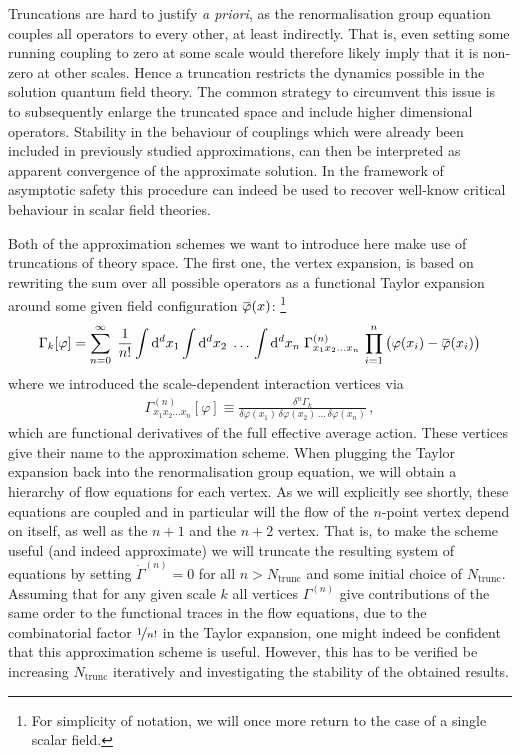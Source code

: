 \documentclass[11pt]{book}
\newcommand{\overbar}[1]{\mkern 1.5mu\overline{\mkern-1.5mu#1\mkern-1.5mu}\mkern 1.5mu}
\newcommand\Ntrunc{ N_{\scriptscriptstyle{\mathrm{trunc}}} }
\newcommand{\bp}{\overbar \varphi}
\numberwithin{equation}{chapter}
\begin{document}
Truncations are hard to justify \textit{a priori}, as the renormalisation
group equation couples all operators to every other, at least indirectly.
That is, even setting some running coupling to zero at some scale would
therefore likely imply that it is non-zero at other scales.
Hence a truncation restricts the dynamics possible in the solution quantum
field theory. The common strategy to circumvent this issue is to
subsequently enlarge the truncated space and include higher dimensional operators.
Stability in the behaviour of couplings which were already been included
in previously studied approximations, can then be interpreted as apparent
convergence of the approximate solution. In the framework of asymptotic
safety this procedure can indeed be used to recover well-know
critical behaviour in scalar field theories.

Both of the approximation schemes we want to introduce here make use
of truncations of theory space. The first one, the vertex expansion,
is based on rewriting the sum over all possible operators as a
functional Taylor expansion around some given field configuration
$\bp(x)$:%
\footnote{%
  For simplicity of notation, we will once more return to the
  case of a single scalar field.
}
\begin{align}
  \Gamma_k [\varphi] =
  \sum_{n=0}^{\infty} \; \frac{1}{n!}
  \int \mathrm d^dx_1
  \int \mathrm d^dx_2
  \; \dots \,
  \int \mathrm d^dx_n \;
  \Gamma_{x_1 x_2 \dots x_n}^{(n)} \,
  \prod_{i=1}^n
  \big( \varphi(x_i) - \bp(x_i) \big)
\end{align}
where we introduced the scale-dependent interaction vertices via
\begin{align}
  \Gamma_{x_1 x_2 \dots x_n}^{(n)}[\varphi] \equiv
  \frac{\delta^n\Gamma_k}{\delta\varphi(x_1) \, \delta\varphi(x_2) \, \dots \, \delta\varphi(x_n)} \,,
\end{align}
which are functional derivatives of the full effective average action. These
vertices give their name to the approximation scheme. When plugging the
Taylor expansion back into the renormalisation group equation, we will
obtain a hierarchy of flow equations for each vertex. As we will explicitly
see shortly, these equations are coupled and in particular will the flow of
the $n$-point vertex depend on itself, as well as the $n+1$ and the $n+2$
vertex. That is, to make the scheme useful (and indeed approximate)
we will truncate the resulting system of equations by setting
$\dot \Gamma^{(n)} = 0$ for all $n>\Ntrunc$ and some initial choice of $\Ntrunc$.
Assuming that for any given scale $k$ all vertices $\Gamma^{(n)}$ give
contributions of the same order to the functional traces in the flow equations,
due to the combinatorial factor $\nicefrac{1}{n!}$ in the Taylor expansion,
one might indeed be confident that this approximation scheme is useful.
However, this has to be verified be increasing $\Ntrunc$ iteratively
and investigating the stability of the obtained results.
\end{document}

